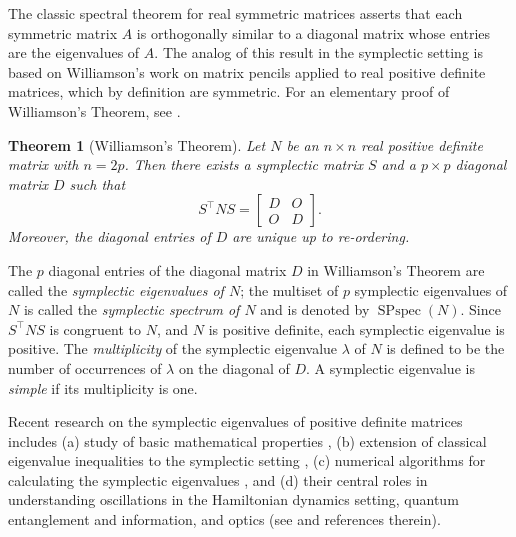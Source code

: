 \documentclass[12pt]{article}
\newtheorem{thm}{Theorem}[section]
\theoremstyle{definition}
\theoremstyle{definition}
\theoremstyle{definition}
\numberwithin{figure}{section}
\numberwithin{equation}{section}
\newcommand{\trans}{^{\top}}
\newcommand{\spspec}{\operatorname{SPspec}}
\begin{document}
The classic spectral theorem for real symmetric matrices asserts that each symmetric matrix $A$ is 
orthogonally similar to a diagonal matrix whose entries are the eigenvalues of $A$.
{The analog of this result in the symplectic setting is based on Williamson's  work on matrix pencils \cite{W36} applied to 
real positive definite matrices, which by definition are symmetric. 
For an elementary proof of Williamson's Theorem, see \cite{I18}.}

\begin{thm}[Williamson's Theorem]
Let $N$ be an $n \times n$ real positive definite matrix with $n=2p$. 
Then there exists a symplectic matrix $S$ and a $p\times p$ diagonal matrix $D$ such that 
\[ S\trans N S= \left[ \begin{array}{cc}
D & O \\
O & D \end{array} \right] .\]
Moreover, the diagonal entries  of $D$ are unique {up to re-ordering}.
\end{thm}
The $p$ diagonal entries of the diagonal matrix $D$ in Williamson's Theorem  are called the {\it symplectic eigenvalues of $N$}; the multiset of $p$ symplectic eigenvalues of $N$ is called the \emph{symplectic spectrum of $N$} and is denoted by $\spspec(N)$.
Since $S\trans NS$ is congruent to $N$, and $N$ is positive definite, each symplectic eigenvalue 
is positive.  The \textit{multiplicity} of the symplectic eigenvalue $\lambda$ of $N$
is defined to be the number of occurrences of $\lambda$ on the diagonal of $D$. A symplectic eigenvalue is \textit{simple}
if its multiplicity is one. 

Recent research on the symplectic eigenvalues of positive definite matrices includes
(a) study of basic mathematical properties \cite{Dopico-Johnson},
(b) extension of classical eigenvalue inequalities to the symplectic setting \cite{BJ15,J21,P22,SS22}, 
(c) numerical algorithms for calculating the symplectic eigenvalues \cite{SABT21}, and 
(d) their central roles in understanding  oscillations in the Hamiltonian dynamics setting, 
quantum entanglement and information, and optics (see \cite{N21} and 
references therein).
\end{document}
